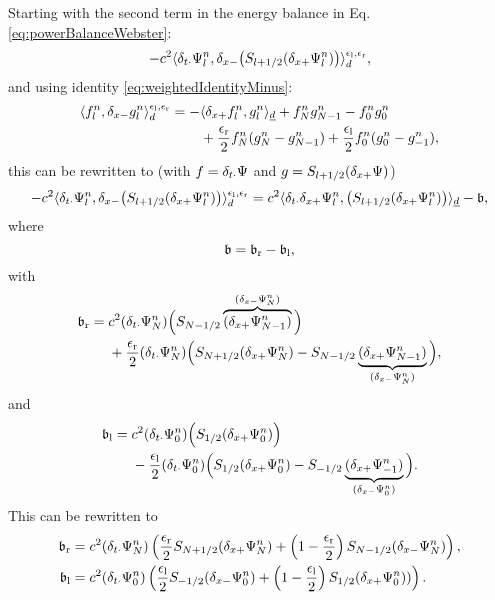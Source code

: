 Starting with the second term in the energy balance in Eq. \eqref{eq:powerBalanceWebster}:
\begin{equation}
    - c^2\langle\delta_{t\cdot}\Psi_l^n, \delta_{x-}\big(S_{l+1/2}(\delta_{x+}\Psi_l^n)\big)\rangle_d^{\epsilon_\text{l},\epsilon_\text{r}},
\end{equation}
and using identity \eqref{eq:weightedIdentityMinus}:
\begin{equation*}
    \begin{aligned}
    \langle f_l^n, \delta_{x-} g_l^n \rangle_d^{\epsilon_\text{l},\epsilon_\text{r}}  = -&\langle \delta_{x+} f_l^n, g_l^n \rangle_{\underline{d}}+ f_N^ng_{N-1}^n - f_0^ng_0^n \\
    &+ \frac{\epsilon_\text{r}}{2}f_N^n(g_N^n-g_{N-1}^n)+ \frac{\epsilon_\text{l}}{2}f_0^n(g_0^n - g_{-1}^n),
    \end{aligned}
\end{equation*}
this can be rewritten to (with $f=\delta_{t\cdot}\Psi$ and $g = S_{l+1/2}(\delta_{x+}\Psi)$)
\begin{equation*}
        -c^2\langle \delta_{t\cdot}\Psi_l^n,\delta_{x-} \big(S_{l+1/2}(\delta_{x+}\Psi_l^n)\big) \rangle_{d}^{\epsilon_\text{l},\epsilon_\text{r}} = c^2\langle \delta_{t\cdot}\delta_{x+} \Psi_l^n, \big(S_{l+1/2}(\delta_{x+}\Psi_l^n)\big)\rangle_{\underline{d}} - \mathfrak{b},
\end{equation*}
where
\begin{equation}
    \mathfrak{b} = \mathfrak{b}_\text{r} - \mathfrak{b}_\text{l},
\end{equation}
with
\begin{equation*}
    \mathfrak{b}_\text{r} =  \begin{aligned}[t]
        &c^2 (\delta_{t\cdot}\Psi_N^n)\Big(S_{N-1/2}\overbrace{(\delta_{x+}\Psi_{N-1}^n)}^{(\delta_{x-}\Psi_{N}^n)}\Big)\\
        &+ \frac{\epsilon_\text{r}}{2}(\delta_{t\cdot}\Psi_{N}^n)\Big(S_{N+1/2}(\delta_{x+}\Psi_N^n)- S_{N-1/2}\underbrace{(\delta_{x+} \Psi_{N-1}^n)}_{(\delta_{x-}\Psi_{N}^n)}\Big),
    \end{aligned}
\end{equation*}
and 
\begin{equation*}
    \mathfrak{b}_\text{l} = \begin{aligned}[t]
        &c^2(\delta_{t\cdot}\Psi_0^n)\Big(S_{1/2}(\delta_{x+}\Psi_0^n)\Big)\\
        & -\frac{\epsilon_\text{l}}{2}(\delta_{t\cdot}\Psi_0^n)\Big(S_{1/2}(\delta_{x+}\Psi_0^n)-S_{-1/2}\underbrace{(\delta_{x+}\Psi_{-1}^n)}_{(\delta_{x-}\Psi_0^n)}\Big).
    \end{aligned}
\end{equation*}
This can be rewritten to
\begin{align}
    \mathfrak{b}_\text{r} &= c^2(\delta_{t\cdot}\Psi_N^n)\left(\frac{\epsilon_\text{r}}{2}S_{N+1/2}(\delta_{x+} \Psi_N^n) + \left(1-\frac{\epsilon_\text{r}}{2}\right)S_{N-1/2}(\delta_{x-}\Psi_N^n)\right),\\
    \mathfrak{b}_\text{l} &= c^2(\delta_{t\cdot}\Psi_0^n)\left(\frac{\epsilon_\text{l}}{2}S_{-1/2}(\delta_{x-}\Psi_0^n)+\left(1-\frac{\epsilon_\text{l}}{2}\right)S_{1/2}(\delta_{x+} \Psi_0^n))\right).
\end{align}


